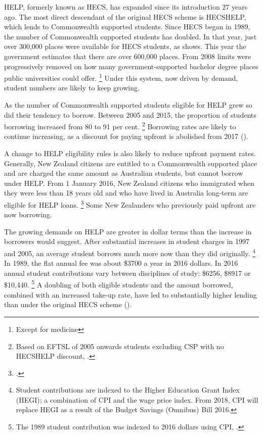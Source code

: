 \documentclass[embargoed]{grattan}
\begin{document}
\gls{HELP}, formerly known as \gls{HECS}, has expanded since its introduction 27 years ago.
The most direct descendant of the original \gls{HECS} scheme is \gls{HECSHELP}, which lends to Commonwealth supported students.
Since \gls{HECS} began in 1989, the number of Commonwealth supported students has doubled.
In that year, just over 300,000 places were available for \gls{HECS} students, as  shows.\afterpage{\cleardoublepage} %
This year the government estimates that there are over 600,000 places.
From 2008 limits were progressively removed on how many government-supported bachelor degree places public universities could offer.%
\footnote{Except for medicine} Under this system, now driven by demand, student numbers are likely to keep growing.


As the number of Commonwealth supported students eligible for \gls{HELP} grew so did their tendency to borrow.
Between 2005 and 2015, the proportion of students borrowing increased from 80 to 91 per cent.%
\footnote{Based on \gls{EFTSL} of 2005 onwards students excluding CSP with no \gls{HECSHELP} discount, \textcite[][section 5: liability status categories]{EducationvariousyearsSelectedhighereducation}.} Borrowing rates are likely to continue increasing, as a discount for paying upfront is abolished from 2017 ().

A change to \gls{HELP} eligibility rules is also likely to reduce upfront payment rates.
Generally, New Zealand citizens are entitled to a Commonwealth supported place and are charged the same amount as Australian students, but cannot borrow under \gls{HELP}.
From 1 January 2016, New Zealand citizens who immigrated when they were less than 18 years old and who have lived in Australia long-term are eligible for \gls{HELP} loans.%
\footcite{Education2016FAQsNewZealand} Some New Zealanders who previously paid upfront are now borrowing.

The growing demands on \gls{HELP} are greater in dollar terms than the increase in borrowers would suggest.
After substantial increases in student charges in 1997 and 2005, an average student borrows much more now than they did originally.%
\footnote{Student contributions are indexed to the Higher Education Grant Index (HEGI); a combination of \gls{CPI} and the wage price index.
From 2018, \gls{CPI} will replace HEGI as a result of the Budget Savings (Omnibus) Bill 2016.} In 1989, the flat annual fee was about \$3700 a year in 2016 dollars.
In 2016 annual student contributions vary between disciplines of study: \$6256, \$8917 or \$10,440.%
\footnote{The 1989 student contribution was indexed to 2016 dollars using \gls{CPI}, \textcites{DET2015FundingClusters}{ABS2016ConsumerPriceIndex}.} 
A doubling of both eligible students and the amount borrowed, combined with an increased take-up rate, have led to substantially higher lending than under the original \gls{HECS} scheme ().
\end{document}
